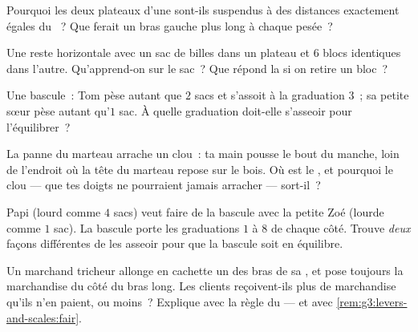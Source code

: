 \begin{exercise}[$\star$]\label{exo:g3:levers-and-scales:6}
Pourquoi les deux plateaux d'une  sont-ils suspendus à des
distances exactement égales du ~? Que ferait un bras gauche plus
long à chaque pesée~?
\end{exercise}

\begin{exercise}[$\star$]\label{exo:g3:levers-and-scales:7}
Une  reste horizontale avec un sac de billes dans un plateau
et $6$ blocs identiques dans l'autre. Qu'apprend-on sur le sac~? Que
répond la  si on retire un bloc~?
\end{exercise}

\begin{exercise}[$\star$]\label{exo:g3:levers-and-scales:8}
Une bascule~: Tom pèse autant que $2$ sacs et s'assoit à la
graduation $3$~; sa petite sœur pèse autant qu'$1$ sac. À quelle
graduation doit-elle s'asseoir pour l'équilibrer~?
\end{exercise}

\begin{exercise}[$\star$]\label{exo:g3:levers-and-scales:9}
La panne du marteau arrache un clou~: ta main pousse le bout du
manche, loin de l'endroit où la tête du marteau repose sur le bois.
Où est le , et pourquoi le clou --- que tes doigts ne
pourraient jamais arracher --- sort-il~?
\end{exercise}

\begin{exercise}[$\star\star$]\label{exo:g3:levers-and-scales:10}
Papi (lourd comme $4$ sacs) veut faire de la bascule avec la petite
Zoé (lourde comme $1$ sac). La bascule porte les graduations $1$ à
$8$ de chaque côté. Trouve \emph{deux} façons différentes de les
asseoir pour que la bascule soit en équilibre.
\end{exercise}

\begin{exercise}[$\star\star$]\label{exo:g3:levers-and-scales:11}
Un marchand tricheur allonge en cachette un des bras de sa ,
et pose toujours la marchandise du côté du bras long. Les clients
reçoivent-ils plus de marchandise qu'ils n'en paient, ou moins~?
Explique avec la règle du  --- et avec
\cref{rem:g3:levers-and-scales:fair}.
\end{exercise}

